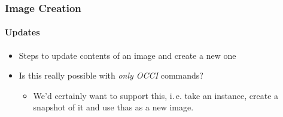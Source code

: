 \begin{frame}
\frametitle{Image Creation}
\framesubtitle{Updates}
\begin{itemize}
\item Steps to update contents of an image and create a new one
\item Is this really possible with \emph{only OCCI} commands?
  \begin{itemize}
  \item We'd certainly want to support this, i.\,e. take an instance,
    create a snapshot of it and use thas as a new image.
  \end{itemize}
\end{itemize}
\end{frame}
